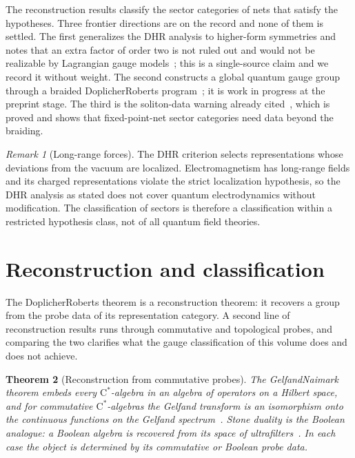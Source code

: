 \documentclass[11pt,letterpaper]{article}
\newtheorem{theorem}{Theorem}[section]
\theoremstyle{definition}
\theoremstyle{remark}
\newtheorem{remark}[theorem]{Remark}
\begin{document}
The reconstruction results classify the sector categories of nets that satisfy the hypotheses. Three frontier directions are on the record and none of them is settled. The first generalizes the DHR analysis to higher-form symmetries and notes that an extra factor of order two is not ruled out and would not be realizable by Lagrangian gauge models~\cite{casini-magan}; this is a single-source claim and we record it without weight. The second constructs a global quantum gauge group through a braided Doplicher\textendash{}Roberts program~\cite{pinzari}; it is work in progress at the preprint stage. The third is the soliton-data warning already cited~\cite{mueger}, which is proved and shows that fixed-point-net sector categories need data beyond the braiding.

\begin{remark}[Long-range forces]
\label{rem:long-range}
The DHR criterion selects representations whose deviations from the vacuum are localized. Electromagnetism has long-range fields and its charged representations violate the strict localization hypothesis, so the DHR analysis as stated does not cover quantum electrodynamics without modification. The classification of sectors is therefore a classification within a restricted hypothesis class, not of all quantum field theories.
\end{remark}

\section{Reconstruction and classification}
\label{sec:reconstruction}

The Doplicher\textendash{}Roberts theorem is a reconstruction theorem: it recovers a group from the probe data of its representation category. A second line of reconstruction results runs through commutative and topological probes, and comparing the two clarifies what the gauge classification of this volume does and does not achieve.

\begin{theorem}[Reconstruction from commutative probes]
\label{thm:gelfand}
The Gelfand\textendash{}Naimark theorem embeds every $\mathrm{C}^*$-algebra in an algebra of operators on a Hilbert space, and for commutative $\mathrm{C}^*$-algebras the Gelfand transform is an isomorphism onto the continuous functions on the Gelfand spectrum~\cite{gelfand-naimark}. Stone duality is the Boolean analogue: a Boolean algebra is recovered from its space of ultrafilters~\cite{stone}. In each case the object is determined by its commutative or Boolean probe data.
\end{theorem}
\end{document}
